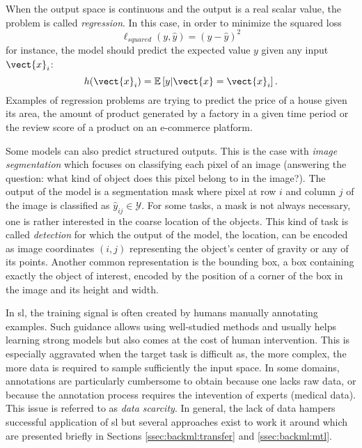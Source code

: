 When the output space is continuous and the output is a real scalar value, the
problem is called \textit{regression}. In this case, in order to minimize the squared loss
\begin{equation}
  \label{eqn:backml:squaredloss}
  \ell_{squared}(y, \hat{y}) = (y - \hat{y})^2
\end{equation}
for instance, the model should predict the
expected value $y$ given any input $\vect{x}_i$:
\begin{equation}
h(\vect{x}_i) = \mathbb{E}\left[y|\vect{x}=\vect{x}_i\right].
\end{equation}
Examples of regression problems are trying to predict the price of a house given
its area, the amount of product generated by a factory in a given time period or
the review score of a product on an e-commerce platform.

Some models can also predict structured outputs. This is the case with
\textit{image segmentation} which focuses on classifying each pixel of an image
(\ie answering the question: what kind of object does this pixel belong to in the
image?). The output of the model is a segmentation mask where pixel at row $i$
and column $j$ of the image is classified as $\hat{y}_{ij} \in \mathcal{Y}$. For
some tasks, a mask is not always necessary, one is rather interested in the coarse
location of the objects. This kind of task is called \textit{detection} for which
the output of the model, the location, can be encoded as image coordinates $(i, j)$
representing the object's center of gravity or any of its points. Another common
representation is the bounding box, a box containing exactly the object of interest,
encoded by the position of a corner of the box in the image and its height and
width.

In \acrlong{sl}, the training signal is often created by humans manually annotating
examples. Such guidance allows using well-studied methods and usually helps learning
strong models but also comes at the cost of human intervention. This is especially
aggravated when the target task is difficult as, the more complex, the more data
is required to sample sufficiently the input space. In some domains, annotations
are particularly cumbersome to obtain because one lacks raw data, or because the
annotation process requires the intevention of experts (\eg medical data). This
issue is referred to as \textit{data scarcity}. In general, the lack of data
hampers successful application of \acrlong{sl} but several approaches exist to
work it around which are presented briefly in Sections \ref{ssec:backml:transfer}
and \ref{ssec:backml:mtl}.

